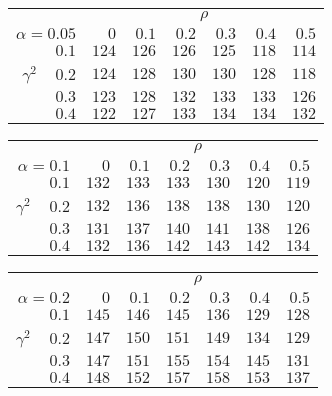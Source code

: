 \begin{tabular}{r|rrrrrr}
\hline\hline
 &\multicolumn{6}{c}{$\rho$} \\ 
 $\alpha = 0.05$ & $0$ & $0.1$ & $0.2$ & $0.3$ & $0.4$ & $0.5$ \\ 
 \hline$0.1$ & $124$ & $126$ & $126$ & $125$ & $118$ & $114$\\ 
$\gamma^2\;\;\;$ $0.2$ & $124$ & $128$ & $130$ & $130$ & $128$ & $118$\\ 
$0.3$ & $123$ & $128$ & $132$ & $133$ & $133$ & $126$\\ 
$0.4$ & $122$ & $127$ & $133$ & $134$ & $134$ & $132$\\ 
 \hline 
 \end{tabular}
 
 \vspace{2em} 
 
\begin{tabular}{r|rrrrrr}
\hline\hline
 &\multicolumn{6}{c}{$\rho$} \\ 
 $\alpha = 0.1$ & $0$ & $0.1$ & $0.2$ & $0.3$ & $0.4$ & $0.5$ \\ 
 \hline$0.1$ & $132$ & $133$ & $133$ & $130$ & $120$ & $119$\\ 
$\gamma^2\;\;\;$ $0.2$ & $132$ & $136$ & $138$ & $138$ & $130$ & $120$\\ 
$0.3$ & $131$ & $137$ & $140$ & $141$ & $138$ & $126$\\ 
$0.4$ & $132$ & $136$ & $142$ & $143$ & $142$ & $134$\\ 
 \hline 
 \end{tabular}
 
 \vspace{2em} 
 
\begin{tabular}{r|rrrrrr}
\hline\hline
 &\multicolumn{6}{c}{$\rho$} \\ 
 $\alpha = 0.2$ & $0$ & $0.1$ & $0.2$ & $0.3$ & $0.4$ & $0.5$ \\ 
 \hline$0.1$ & $145$ & $146$ & $145$ & $136$ & $129$ & $128$\\ 
$\gamma^2\;\;\;$ $0.2$ & $147$ & $150$ & $151$ & $149$ & $134$ & $129$\\ 
$0.3$ & $147$ & $151$ & $155$ & $154$ & $145$ & $131$\\ 
$0.4$ & $148$ & $152$ & $157$ & $158$ & $153$ & $137$\\ 
 \hline 
 \end{tabular}